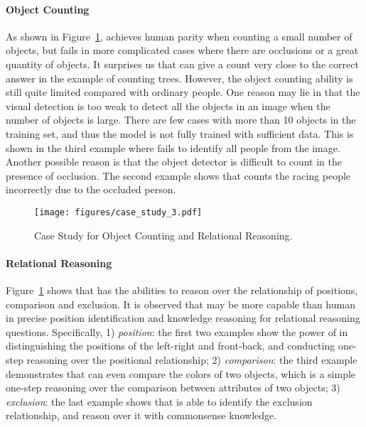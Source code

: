 \paragraph{Object Counting}
As shown in Figure~\ref{fig:case_study_2}, \modelname achieves human parity when counting a small number of objects, but fails in more complicated cases where there are occlusions or a great quantity of objects. It surprises us that \modelname can give a count very close to the correct answer in the example of counting trees. However, the object counting ability is still quite limited compared with ordinary people. One reason may lie in that the visual detection is too weak to detect all the objects in an image when the number of objects is large. There are few cases with more than 10 objects in the training set, and thus the model is not fully trained with sufficient data. This is shown in the third example where \modelname fails to identify all people from the image. Another possible reason is that the object detector is difficult to count in the presence of occlusion. The second example shows that \modelname counts the racing people incorrectly due to the occluded person.

\begin{figure}[t] \centering
    \texttt{[image: figures/case\_study\_3.pdf]}
    \caption{Case Study for Object Counting and Relational Reasoning.}
    \label{fig:case_study_2}
\end{figure}

\paragraph{Relational Reasoning}
Figure~\ref{fig:case_study_2} shows that \modelname has the abilities to reason over the relationship of positions, comparison and exclusion. It is observed that \modelname may be more capable than human in precise position identification and knowledge reasoning for relational reasoning questions. Specifically, 1) \emph{position}: the first two examples show the power of \modelname in distinguishing the positions of the left-right and front-back, and conducting one-step reasoning over the positional relationship; 2) \emph{comparison}: the third example demonstrates that \modelname can even compare the colors of two objects, which is a simple one-step reasoning over the comparison between attributes of two objects; 3) \emph{exclusion}: the last example shows that \modelname is able to identify the exclusion relationship, and reason over it with commonsense knowledge.

